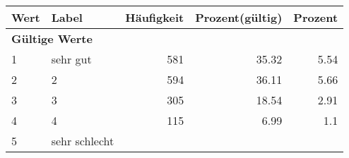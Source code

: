      \begin{longtable}{lXrrr}
     \toprule
     \textbf{Wert} & \textbf{Label} & \textbf{Häufigkeit} & \textbf{Prozent(gültig)} & \textbf{Prozent} \\
     \endhead
     \midrule
     \multicolumn{5}{l}{\textbf{Gültige Werte}}\\

     1 &
     \multicolumn{1}{X}{ sehr gut   } &


       \num{581} &
       \num[round-mode=places,round-precision=2]{35.32} &
         \num[round-mode=places,round-precision=2]{5.54} \\

     2 &
     \multicolumn{1}{X}{ 2   } &


       \num{594} &
       \num[round-mode=places,round-precision=2]{36.11} &
         \num[round-mode=places,round-precision=2]{5.66} \\

     3 &
     \multicolumn{1}{X}{ 3   } &


       \num{305} &
       \num[round-mode=places,round-precision=2]{18.54} &
         \num[round-mode=places,round-precision=2]{2.91} \\

     4 &
     \multicolumn{1}{X}{ 4   } &


       \num{115} &
       \num[round-mode=places,round-precision=2]{6.99} &
         \num[round-mode=places,round-precision=2]{1.1} \\

     5 &
     \multicolumn{1}{X}{ sehr schlecht   } &



\end{longtable}
